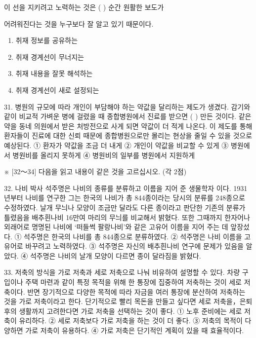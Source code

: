 \documentclass[12pt]{article}
\begin{document}
\begin{enumerate}[1.]
\begin{mdframed}
    이 선을 지키려고 노력하는 것은 (      ) 순간 원활한 보도가

    어려워진다는 것을 누구보다 잘 알고 있기 때문이다.
    \end{mdframed}

    \begin{enumerate}[1)]
        \item 취재 정보를 공유하는
        \item 취재 경계선이 무너지는
        \item 취재 내용을 잘못 해석하는
        \item 취재 경계선이 새로 설정되는
    \end{enumerate}


31.
  병원의 규모에 따라 개인이 부담해야 하는 약값을 달리하는 제도가
생겼다. 감기와 같이 비교적 가벼운 병에 걸렸을 때 종합병원에서 진료를
받으면 (      ) 만든 것이다. 같은 약을 동네 의원에서 받은
처방전으로 사게 되면 약값이 더 적게 나온다. 이 제도를 통해 환자들이
진료에 대한 신뢰 때문에 종합병원으로만 몰리는 현상을 줄일 수 있을
것으로 예상된다.
① 환자가 약값을 조금 더 내게
② 개인이 약값을 비교할 수 있게
③ 병원에서 병원비를 올리지 못하게
④ 병원비의 일부를 병원에서 지원하게




※ [32～34] 다음을 읽고 내용이 같은 것을 고르십시오. (각 2점)

32.
  나비 박사 석주명은 나비의 종류를 분류하고 이름을 지어 준 생물학자
이다. 1931년부터 나비를 연구한 그는 한국의 나비가 총 844종이라는 당시의
분류를 248종으로 수정하였다. 날개 무늬나 모양이 조금만 달라도 다른
종이라고 판단한 기존의 분류가 틀렸음을 배추흰나비 16만여 마리의 무늬를
비교해서 밝혔다. 또한 그때까지 한자어나 외래어로 명명된 나비에 ‘떠들썩
팔랑나비’와 같은 고유어 이름을 지어 주는 데 앞장섰다.
① 석주명은 한국의 나비를 총 844종으로 분류하였다.
② 석주명은 나비 이름을 고유어로 바꾸려고 노력하였다.
③ 석주명은 자신의 배추흰나비 연구에 문제가 있음을 알았다.
④ 석주명은 나비의 날개 모양이 다르면 종이 달라짐을 밝혔다.


33.
  저축의 방식을 가로 저축과 세로 저축으로 나눠 비유하여 설명할 수
있다. 차량 구입이나 주택 마련과 같이 특정 목적을 위해 한 통장에 집중하여
저축하는 것이 세로 저축이다. 반면 장기적으로 다양한 목적에 따라 자금을
여러 통장에 분산하여 저축하는 것을 가로 저축이라고 한다. 단기적으로
빨리 목돈을 만들고 싶다면 세로 저축을，은퇴 후의 생활까지 고려한다면
가로 저축을 선택하는 것이 좋다.
① 노후 준비에는 세로 저축이 유리하다.
② 세로 저축보다 가로 저축을 하는 것이 더 좋다.
③ 저축의 목적이 다양하면 가로 저축이 유용하다.
④ 가로 저축은 단기적인 계획이 있을 때 효율적이다.



\end{enumerate}
\end{document}
